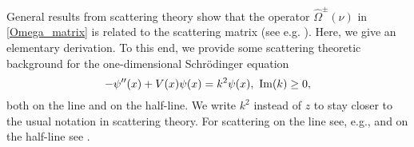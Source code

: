 General results from scattering theory show that the operator $\hat\Omega^\pm(\nu)$ in \eqref{Omega_matrix} 
is related to the scattering matrix (see e.g. \cite[ Thm. 4]{BirmanEntina1967}).
Here, we give an elementary derivation.
To this end, we provide some scattering theoretic background for the one-dimensional
Schr\"odinger equation
\begin{equation}\label{st01}
  -\psi''(x) + V(x)\psi(x) = k^2 \psi(x),\ \operatorname{Im}(k) \geq 0,
\end{equation}
both on the line and on the half-line.
We write $k^2$ instead of $z$ to stay closer to the usual notation in scattering theory.
For scattering on the line see, e.g., \cite[Sec. 2, \S 3, in particular pp. 145, 146]{DeiftTrubowitz1979}
and on the half-line see \cite[Ch. 4]{Yafaev2010}.
